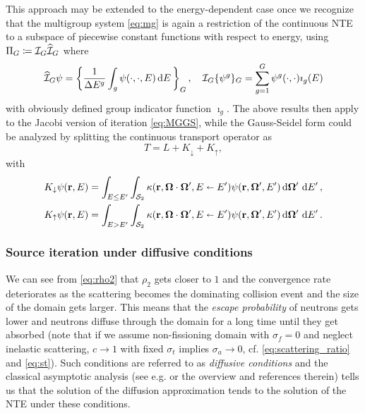 \begin{remark}\label{rem:MG}
	This approach may be extended to the energy-dependent case once we recognize that the multigroup system
	\eqref{eq:mg} is again a restriction of the continuous NTE to a subspace of piecewise constant functions with respect
	to energy, using $\Projop[G] \coloneqq \PiG\PihG$ where
	$$
		\PihG\psi = \left\{\frac{1}{\Delta E^{g}}\int_{g}\psi(\cdot,\cdot,E)\,\d{E}\right\}_G,\quad
		\PiG\{\psi^g\}_G = \sum_{g=1}^G \psi^g(\cdot,\cdot)\imath_g(E)
	$$
	with obviously defined group indicator function $\imath_g$.
	The above results then apply to the Jacobi version of iteration \eqref{eq:MGGS}, while the Gauss-Seidel form
	could be analyzed by splitting the continuous transport operator as 
	$$
		T = L + K_\downarrow + K_\uparrow,
	$$
	with
	$$
	\begin{aligned}
		K_\downarrow\psi(\br,E) &= \intE[']{E \leq E'}{}{
		\intA[']{\kappa(\br,\bomega\cdot\bomega',E\sla E')\psi(\br,\bomega',E')}},\\
		K_\uparrow\psi(\br,E) &= \intE[']{E > E'}{}{
		\intA[']{\kappa(\br,\bomega\cdot\bomega',E\sla E')\psi(\br,\bomega',E')}}.
	\end{aligned}
	$$
\end{remark}

\subsubsection{Source iteration under diffusive conditions} \label{sec:diffusive} 
We can see from \eqref{eq:rho2} that $\rho_2$ gets closer
to $1$ and the convergence rate deteriorates as the scattering becomes the dominating collision event and the size of
the domain gets larger. This means that the \textit{escape probability} of neutrons gets lower and neutrons diffuse
through the domain for a long time until they get absorbed (note that if we assume non-fissioning domain with $\sigma_f
= 0$ and neglect inelastic scattering, $c \to 1$ with fixed $\sigma_t$ implies $\sigma_a \to 0$, cf.
\eqref{eq:scattering_ratio} and \eqref{eq:st}). Such conditions are referred to as \textit{diffusive conditions} and
the classical asymptotic analysis (see e.g. \cite{Larsen1} or the overview \cite{AdamsIdea} and references therein)
tells us that the solution of the diffusion approximation tends to the solution of the NTE under these conditions.

